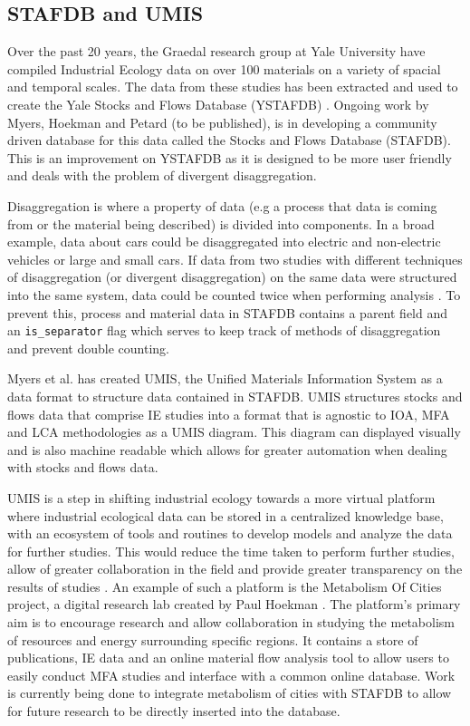 \documentclass[ %
                    author={Tom Jager},
                supervisor={Dr. Daniel Schien},
                    degree={MEng},
                     title={A Bayesian Inference Engine for UMIS Structured Data},
                  subtitle={},
                      type={research},
                      year={2019} ]{dissertation}
\begin{document}
\subsection{STAFDB and UMIS}
Over the past 20 years, the Graedal research group at Yale University have compiled Industrial Ecology data on over 100 materials on a variety of spacial and temporal scales. The data from these studies has been extracted and used to create the Yale Stocks and Flows Database (YSTAFDB) \cite{ystafdb}. Ongoing work by Myers, Hoekman and Petard (to be published), is in developing a community driven database for this data called the Stocks and Flows Database (STAFDB). This is an improvement on YSTAFDB as it is designed to be more user friendly and deals with the problem of divergent disaggregation.

Disaggregation is where a property of data (e.g a process that data is coming from or the material being described) is divided into components. In a broad example, data about cars could be disaggregated into electric and non-electric vehicles or large and small cars. If data from two studies with different techniques of disaggregation (or divergent disaggregation) on the same data were structured into the same system, data could be counted twice when performing analysis \cite{myers2019unified}. To prevent this, process and material data in STAFDB contains a parent field and an \texttt{is\_separator} flag which serves to keep track of methods of disaggregation and prevent double counting.

Myers et al. has created UMIS, the Unified Materials Information System \cite{myers2019unified} as a data format to structure data contained in STAFDB. UMIS structures stocks and flows data that comprise IE studies into a format that is agnostic to IOA, MFA and LCA methodologies as a UMIS diagram. This diagram can displayed visually and is also machine readable which allows for greater automation when dealing with stocks and flows data.

UMIS is a step in shifting industrial ecology towards a more virtual platform where industrial ecological data can be stored in a centralized knowledge base, with an ecosystem of tools and routines to develop models and analyze the data for further studies. This would reduce the time taken to perform further studies, allow of greater collaboration in the field and provide greater transparency on the results of studies \cite{hertwich2018nullius}. An example of such a platform is the Metabolism Of Cities project, a digital research lab created by Paul Hoekman \cite{MetabolismOfCities}. The platform's primary aim is to encourage research and allow collaboration in studying the metabolism of resources and energy surrounding specific regions. It contains a store of publications, IE data and an online material flow analysis tool to allow users to easily conduct MFA studies and interface with a common online database. Work is currently being done to integrate metabolism of cities with STAFDB to allow for future research to be directly inserted into the database. 
\end{document}
